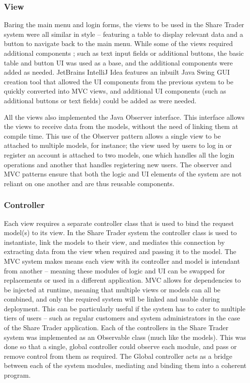 \documentclass[12pt, a4paper,titlepage]{article}
\begin{document}
\subsubsection{View}
Baring the main menu and login forms, the views to be used in the Share Trader
system were all similar in style – featuring a table to display relevant data
and a button to navigate back to the main menu. While some of the views
required additional components ; such as text input fields or additional
buttons, the basic table and button UI was used as a base, and the additional
components were added as needed.  JetBrains IntelliJ Idea features an inbuilt
Java Swing GUI creation tool that allowed the UI components from the previous
system to be quickly converted into MVC views, and additional UI components
(such as additional buttons or text fields) could be added as were needed.

All the views also implemented the Java Observer interface. This interface
allows the views to receive data from the  models, without the need of linking
them at compile time. This use of the Observer pattern allows a single view to
be attached to multiple models, for instance; the view used by users to log in
or register an account is attached to two models, one which handles all the
login operations and another that handles registering new users. The observer
and MVC patterns ensure that both the logic and UI elements of the system are
not reliant on one another and are thus reusable components.

\subsubsection{Controller}
Each view requires a separate controller class that is used to bind the
request model(s) to its view. In the Share Trader system the controller class
is used to instantiate, link the models to their view, and mediates this
connection by extracting data from the view when required and passing it to
the model. The MVC system makes means each view with its controller and model
is intendant from another – meaning these modules of logic and UI can be
swapped for replacements or used in a different application.  MVC allows for
dependencies to be injected at runtime, meaning that multiple views or models
can all be combined, and only the required system will be linked and usable
during deployment. This can be particularly useful if the system has to cater
to multiple tiers of users – such as regular customers and system
administrators in the case of the Share Trader application.
Each of the controllers in the Share Trader system was implemented as an
Observable class (much like the models). This was done so that a single,
global controller could observe each module, and pass or remove control from
them as required. The Global controller acts as a bridge between each of the
system modules, mediating and binding them into a coherent program.
\end{document}
